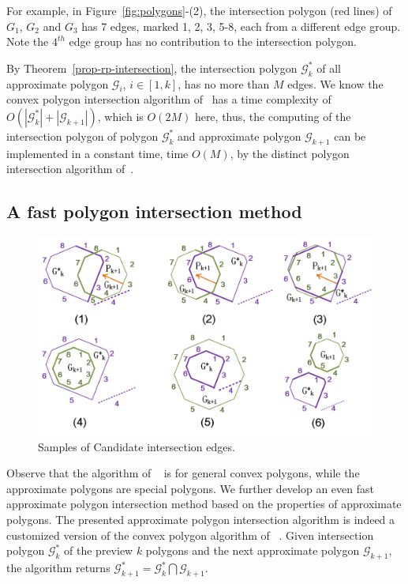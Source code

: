 For example, in Figure~\ref{fig:polygons}-(2), the intersection polygon (red lines) of $G_1$, $G_2$ and $G_3$ has 7 edges, marked 1, 2, 3, 5-8, each from a different edge group. Note the $4^{th}$ edge group has no contribution to the intersection polygon.


By Theorem~\ref{prop-rp-intersection}, the intersection polygon $\mathcal{G}^*_k$ of all approximate polygon $\mathcal{G}_i$, $i \in [1, k]$, has no more than $M$ edges.
We know the convex polygon intersection algorithm of~\cite{ORourke:Intersection} has a time complexity of $O(|\mathcal{G}^*_k| + |\mathcal{G}_{k+1}|)$, which is $O(2M)$ here, thus, the computing of the intersection polygon of polygon $\mathcal{G}^*_k$ and approximate polygon $\mathcal{G}_{k+1}$ can be implemented in a constant time, \ie time $O(M)$, by the distinct polygon intersection algorithm of~\cite{ORourke:Intersection}.
%


\subsection{A fast polygon intersection method}

\begin{figure}[tb!]
\centering
\includegraphics[scale=0.88]{figures/Fig-poly-edges.png}
\vspace{-1ex}
\caption{\small Samples of Candidate intersection edges.}
\vspace{-2ex}
\label{fig:poly-edges}
\end{figure}

Observe that the algorithm of ~\cite{ORourke:Intersection} is for general convex polygons, while the approximate polygons are special polygons. We further develop an even fast approximate polygon intersection method based on the properties of approximate polygons.
%
The presented approximate polygon intersection algorithm is indeed a customized version of the convex polygon algorithm of ~\cite{ORourke:Intersection}.
%
Given intersection polygon $\mathcal{G}^*_k$ of the preview $k$ polygons and the next approximate polygon $\mathcal{G}_{k+1}$, the algorithm returns $\mathcal{G}^*_{k+1} = \mathcal{G}^*_k  \bigcap \mathcal{G}_{k+1}$.

